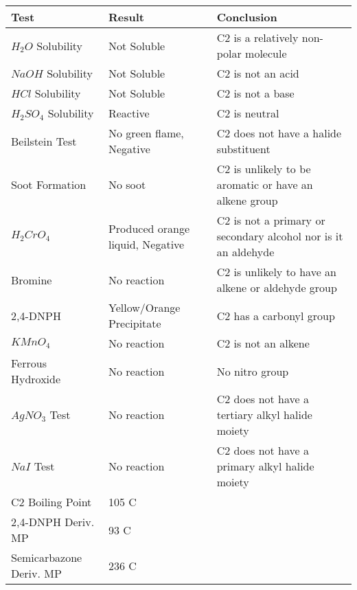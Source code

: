 \documentclass{article}
\begin{document}
	\begin{table}[h]
		\raggedright
		\begin{tabular}{ l  p{3.0cm} p{5.4cm} } 
			\toprule
			\textbf{Test} & \textbf{Result} & \textbf{Conclusion} \\\midrule
			
			$H_2O$ Solubility & Not Soluble & C2 is a relatively non-polar molecule \\\hline
			
			$NaOH$ Solubility & Not Soluble & C2 is not an acid \\\hline
			
			$HCl$ Solubility & Not Soluble & C2 is not a base  \\\hline
			
			$H_2SO_4$ Solubility & Reactive & C2 is neutral \\\hline
			
			Beilstein Test & No green flame, Negative & C2 does not have a halide substituent \\\hline
			
			Soot Formation & No soot & C2 is unlikely to be aromatic or have an alkene group \\\hline
			
			$H_2CrO_4$ & Produced orange liquid, Negative & C2 is not a primary or secondary alcohol nor is it an aldehyde \\\hline
			
			Bromine & No reaction & C2 is unlikely to have an alkene or aldehyde group \\\hline 
			
			2,4-DNPH & Yellow/Orange Precipitate & C2 has a carbonyl group \\\hline 
			
			$KMnO_4$ & No reaction & C2 is not an alkene \\\hline 
			
			Ferrous Hydroxide & No reaction & No nitro group \\\hline 
			
			$AgNO_3$ Test & No reaction & C2 does not have a tertiary alkyl halide moiety \\\hline 
			
			$NaI$ Test & No reaction & C2 does not have a primary alkyl halide moiety \\\hline 
			
			C2 Boiling Point & 105 C &  \\\hline
			
			2,4-DNPH Deriv. MP & 93 C &  \\\hline
			
			Semicarbazone Deriv. MP & 236 C &  \\\hline
			
			
			
		\end{tabular}
	\end{table}
	\pagebreak
\end{document}
